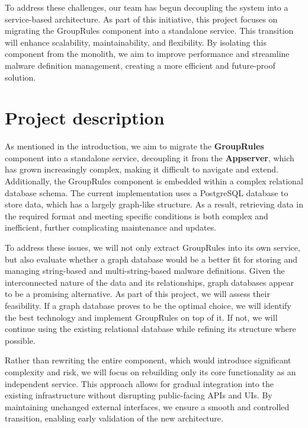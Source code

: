\documentclass{article}
\begin{document}
To address these challenges, our team has begun decoupling the system into a service-based
architecture. As part of this initiative, this project focuses on migrating the GroupRules
component into a standalone service. This transition will enhance scalability, maintainability, and
flexibility. By isolating this component from the monolith, we aim to improve performance and
streamline malware definition management, creating a more efficient and future-proof solution.

\section{Project description}

As mentioned in the introduction, we aim to migrate the \textbf{GroupRules} component into a
standalone service, decoupling it from the \textbf{Appserver}, which has grown increasingly
complex, making it difficult to navigate and extend. Additionally, the GroupRules component is
embedded within a complex relational database schema. The current implementation uses a PostgreSQL
database to store data, which has a largely graph-like structure. As a result, retrieving data in
the required format and meeting specific conditions is both complex and inefficient, further
complicating maintenance and updates.

To address these issues, we will not only extract GroupRules into its own service, but also
evaluate whether a graph database would be a better fit for storing and managing string-based and
multi-string-based malware definitions. Given the interconnected nature of the data and its
relationships, graph databases appear to be a promising alternative. As part of this project, we
will assess their feasibility. If a graph database proves to be the optimal choice, we will
identify the best technology and implement GroupRules on top of it. If not, we will continue using
the existing relational database while refining its structure where possible.

Rather than rewriting the entire component, which would introduce significant complexity and risk,
we will focus on rebuilding only its core functionality as an independent service. This approach
allows for gradual integration into the existing infrastructure without disrupting public-facing
APIs and UIs. By maintaining unchanged external interfaces, we ensure a smooth and controlled
transition, enabling early validation of the new architecture.
\end{document}
